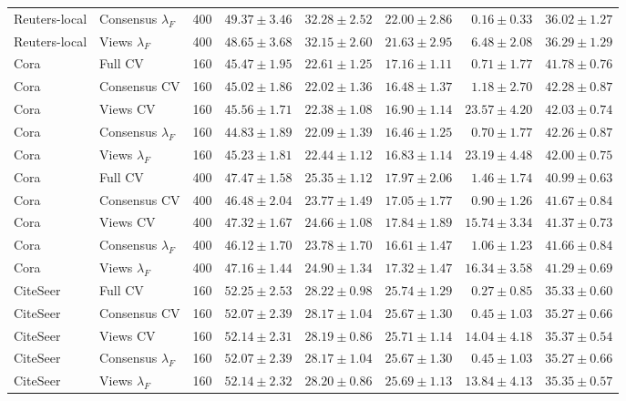 \begin{longtable}{llrrrrrr}
Reuters-local & Consensus $\lambda_F$ & 400 & $49.37\pm3.46$ & $32.28\pm2.52$ & $22.00\pm2.86$ & $0.16\pm0.33$ & $36.02\pm1.27$\\
Reuters-local & Views $\lambda_F$ & 400 & $48.65\pm3.68$ & $32.15\pm2.60$ & $21.63\pm2.95$ & $6.48\pm2.08$ & $36.29\pm1.29$\\
Cora & Full CV & 160 & $45.47\pm1.95$ & $22.61\pm1.25$ & $17.16\pm1.11$ & $0.71\pm1.77$ & $41.78\pm0.76$\\
Cora & Consensus CV & 160 & $45.02\pm1.86$ & $22.02\pm1.36$ & $16.48\pm1.37$ & $1.18\pm2.70$ & $42.28\pm0.87$\\
Cora & Views CV & 160 & $45.56\pm1.71$ & $22.38\pm1.08$ & $16.90\pm1.14$ & $23.57\pm4.20$ & $42.03\pm0.74$\\
Cora & Consensus $\lambda_F$ & 160 & $44.83\pm1.89$ & $22.09\pm1.39$ & $16.46\pm1.25$ & $0.70\pm1.77$ & $42.26\pm0.87$\\
Cora & Views $\lambda_F$ & 160 & $45.23\pm1.81$ & $22.44\pm1.12$ & $16.83\pm1.14$ & $23.19\pm4.48$ & $42.00\pm0.75$\\
Cora & Full CV & 400 & $47.47\pm1.58$ & $25.35\pm1.12$ & $17.97\pm2.06$ & $1.46\pm1.74$ & $40.99\pm0.63$\\
Cora & Consensus CV & 400 & $46.48\pm2.04$ & $23.77\pm1.49$ & $17.05\pm1.77$ & $0.90\pm1.26$ & $41.67\pm0.84$\\
Cora & Views CV & 400 & $47.32\pm1.67$ & $24.66\pm1.08$ & $17.84\pm1.89$ & $15.74\pm3.34$ & $41.37\pm0.73$\\
Cora & Consensus $\lambda_F$ & 400 & $46.12\pm1.70$ & $23.78\pm1.70$ & $16.61\pm1.47$ & $1.06\pm1.23$ & $41.66\pm0.84$\\
Cora & Views $\lambda_F$ & 400 & $47.16\pm1.44$ & $24.90\pm1.34$ & $17.32\pm1.47$ & $16.34\pm3.58$ & $41.29\pm0.69$\\
CiteSeer & Full CV & 160 & $52.25\pm2.53$ & $28.22\pm0.98$ & $25.74\pm1.29$ & $0.27\pm0.85$ & $35.33\pm0.60$\\
CiteSeer & Consensus CV & 160 & $52.07\pm2.39$ & $28.17\pm1.04$ & $25.67\pm1.30$ & $0.45\pm1.03$ & $35.27\pm0.66$\\
CiteSeer & Views CV & 160 & $52.14\pm2.31$ & $28.19\pm0.86$ & $25.71\pm1.14$ & $14.04\pm4.18$ & $35.37\pm0.54$\\
CiteSeer & Consensus $\lambda_F$ & 160 & $52.07\pm2.39$ & $28.17\pm1.04$ & $25.67\pm1.30$ & $0.45\pm1.03$ & $35.27\pm0.66$\\
CiteSeer & Views $\lambda_F$ & 160 & $52.14\pm2.32$ & $28.20\pm0.86$ & $25.69\pm1.13$ & $13.84\pm4.13$ & $35.35\pm0.57$\\

\end{longtable}

